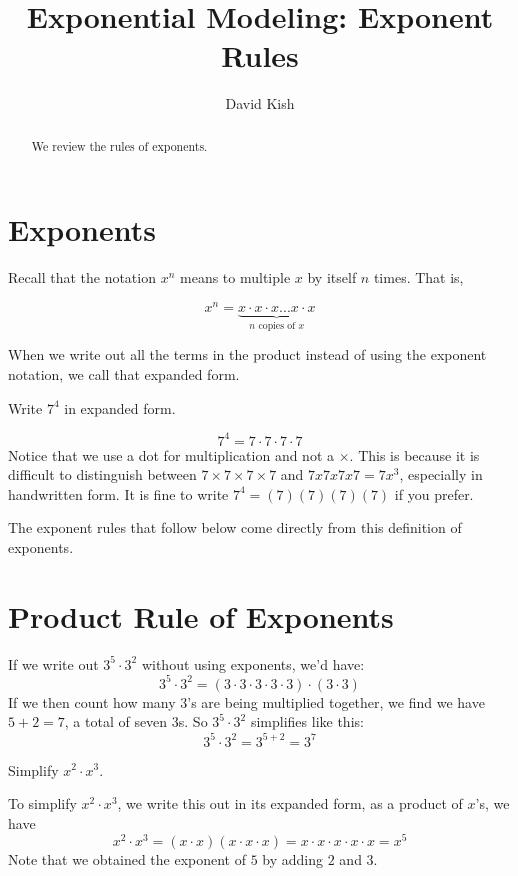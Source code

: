 \documentclass{ximera}
\author{David Kish}
\title{Exponential Modeling: Exponent Rules}
\begin{document}
\begin{abstract}
We review the rules of exponents.
\end{abstract}
\maketitle

\section{Exponents}

Recall that the notation $x^n$ means to multiple $x$ by itself $n$ times.  That is,

\begin{definition}
\[
x^n=\underbrace{x \cdot x \cdot x ... x \cdot x}_{\textrm{$n$ copies of $x$}}
\]
\end{definition}

When we write out all the terms in the product instead of using the exponent notation, we call that expanded form.

\begin{example}
Write $7^4$ in expanded form.
\begin{explanation}
$$7^4=7\cdot7\cdot7\cdot7$$
Notice that we use a dot for multiplication and not a $\times$.  This is because it is difficult to distinguish between $7\times7\times7\times7$ and $7x7x7x7=7x^3$, especially in handwritten form.  It is fine to write $7^4=(7)(7)(7)(7)$ if you prefer.
\end{explanation}
\end{example}
 
The exponent rules that follow below come directly from this definition of exponents. 

    \section{Product Rule of Exponents}
        If we write out $3^5\cdot 3^2$ without using exponents,
        we'd have:
$$
 3^5 \cdot 3^2 = \left(3 \cdot 3\cdot 3\cdot 3\cdot 3\right) \cdot \left(3 \cdot 3\right)
$$
        If we then count how many $3$'s are being multiplied together,
        we find we have $5+2=7$, a total of seven $3$s.
        So $3^5\cdot 3^2$ simplifies like this:
       $$
          3^5\cdot 3^2 = 3^{5+2} = 3^7
$$
\begin{example}          
Simplify $x^2\cdot x^3$. \\
\begin{explanation}       
          To simplify $x^2\cdot x^3$,
          we write this out in its expanded form,
          as a product of $x$'s, we have
$$
            x^2\cdot x^3 =(x\cdot x)(x \cdot x \cdot x)
            =x\cdot x\cdot x \cdot x \cdot x
            =x^5
   $$   
          Note that we obtained the exponent of $5$ by adding $2$ and $3$.
  \end{explanation}
\end{example}
\end{document}
